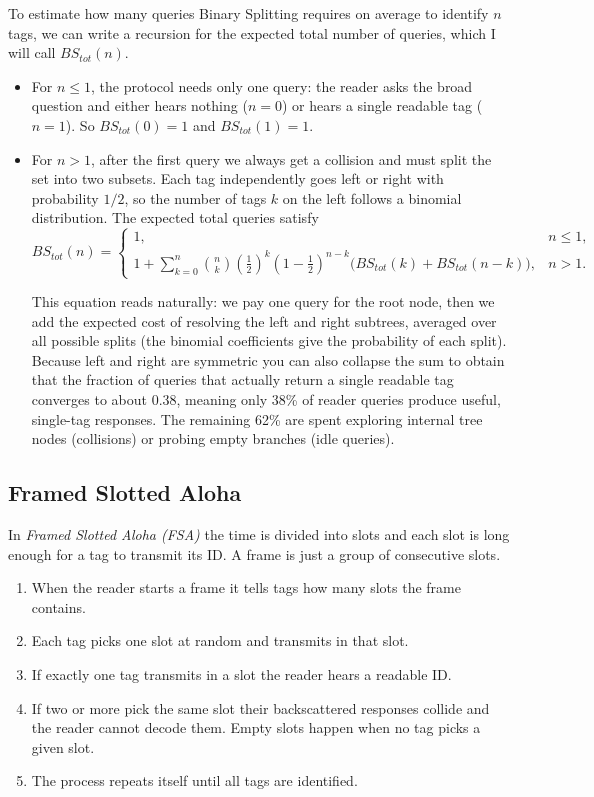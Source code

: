 To estimate how many queries Binary Splitting requires on average to identify $n$ tags, we can write a recursion for the expected total number of queries, which I will call $BS_{tot}(n)$. 
\begin{itemize}
    \item For $n \leq 1$, the protocol needs only one query: the reader asks the broad question and either hears nothing ($n=0$) or hears a single readable tag ($n=1$). So $BS_{tot}(0) = 1$ and $BS_{tot}(1) = 1$.
    \item For $n > 1$, after the first query we always get a collision and must split the set into two subsets. Each tag independently goes left or right with probability $1/2$, so the number of tags $k$ on the left follows a binomial distribution. The expected total queries satisfy
    \[BS_{tot}(n)=
    \begin{cases}
        1, & n \leq 1, \\[6pt]
        1+\displaystyle\sum_{k=0}^n \binom{n}{k}
            \left(\frac{1}{2}\right)^k
            \left(1-\frac{1}{2}\right)^{n-k}
            \bigl(BS_{tot}(k)+BS_{tot}(n-k)\bigr), & n > 1.
    \end{cases}
    \]
    
This equation reads naturally: we pay one query for the root node, then we add the expected cost of resolving the left and right subtrees, averaged over all possible splits (the binomial coefficients give the probability of each split). Because left and right are symmetric you can also collapse the sum to obtain that the fraction of queries that actually return a single readable tag converges to about 0.38, meaning only 38\% of reader queries produce useful, single-tag responses. The remaining 62\% are spent exploring internal tree nodes (collisions) or probing empty branches (idle queries).
\end{itemize}

\subsection{Framed Slotted Aloha}
In \textit{Framed Slotted Aloha (FSA)} the time is divided into slots and each slot is long enough for a tag to transmit its ID. A frame is just a group of consecutive slots. 
\begin{enumerate}
    \item When the reader starts a frame it tells tags how many slots the frame contains. 
    \item Each tag picks one slot at random and transmits in that slot. 
    \item If exactly one tag transmits in a slot the reader hears a readable ID. 
    \item If two or more pick the same slot their backscattered responses collide and the reader cannot decode them. Empty slots happen when no tag picks a given slot.
    \item The process repeats itself until all tags are identified.
\end{enumerate}

